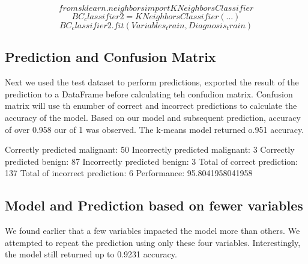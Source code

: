 \documentclass[conference]{IEEEtran}
\begin{document}
\begin{equation}
from sklearn.neighbors import KNeighborsClassifier
\end{equation}
\begin{equation}
BC_classifier2 = KNeighborsClassifier (...)
\end{equation}
\begin{equation}
BC_classifier2.fit(Variables_train, Diagnosis_train)
\end{equation}


\subsection{Prediction and Confusion Matrix}
Next we used the test dataset to perform predictions, exported the result of the prediction to a DataFrame before calculating teh confudion matrix. Confusion matrix will use th enumber of correct and incorrect predictions to calculate the accuracy of the model. Based on our model and subsequent prediction, accuracy of over 0.958 our of 1 was observed. The k-means model returned o.951 accuracy.


		Correctly predicted malignant: 50
		Incorrectly predicted malignant: 3
		Correctly predicted benign: 87
		Incorrectly predicted benign: 3
		Total of correct prediction: 137
		Total of incorrect prediction: 6
		Performance: 95.8041958041958


\subsection{Model and Prediction based on fewer variables}
We found earlier that a few variables impacted the model more than others. We attempted to repeat the prediction using only these four variables. Interestingly, the model still returned up to 0.9231 accuracy. 
\end{document}

